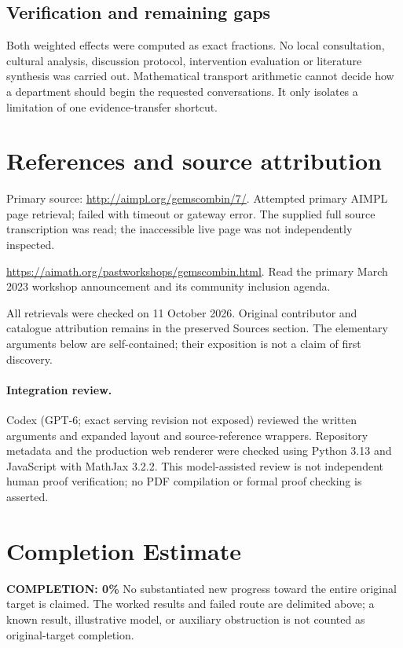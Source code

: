 \documentclass[11pt]{article}
\begin{document}
\subsection{Verification and remaining gaps}
Both weighted effects were computed as exact fractions. No local consultation, cultural analysis, discussion protocol, intervention evaluation or literature synthesis was carried out. Mathematical transport arithmetic cannot decide how a department should begin the requested conversations. It only isolates a limitation of one evidence-transfer shortcut.

\section{References and source attribution}
Primary source: \url{http://aimpl.org/gemscombin/7/}. Attempted primary AIMPL page retrieval; failed with timeout or gateway error. The supplied full source transcription was read; the inaccessible live page was not independently inspected.

\url{https://aimath.org/pastworkshops/gemscombin.html}. Read the primary March 2023 workshop announcement and its community inclusion agenda.

All retrievals were checked on 11 October 2026. Original contributor and catalogue attribution remains in the preserved Sources section. The elementary arguments below are self-contained; their exposition is not a claim of first discovery.


\paragraph{Integration review.} Codex (GPT-6; exact serving revision not exposed) reviewed the written arguments and expanded layout and source-reference wrappers. Repository metadata and the production web renderer were checked using Python 3.13 and JavaScript with MathJax 3.2.2. This model-assisted review is not independent human proof verification; no PDF compilation or formal proof checking is asserted.

\section{Completion Estimate}
\noindent\textbf{COMPLETION: 0\%}
No substantiated new progress toward the entire original target is claimed. The worked results and failed route are delimited above; a known result, illustrative model, or auxiliary obstruction is not counted as original-target completion.
\end{document}
